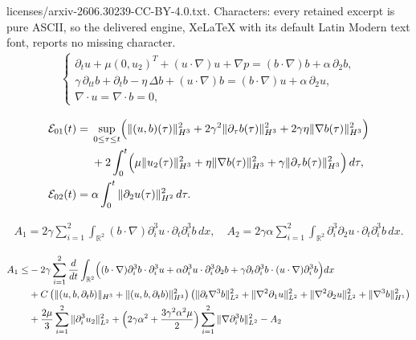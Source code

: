 \documentclass[10pt,a4paper]{amsart}
\begin{document}
licenses/arxiv-2606.30239-CC-BY-4.0.txt. Characters: every retained excerpt is pure ASCII, so the delivered engine, XeLaTeX with its default Latin Modern text font, reports no missing character.
\begin{align}\label{type-wave-1}
	\left \{
	\begin{array}{lll}
		\partial_t u + \mu(0,u_2)^T + (u\cdot\nabla)u + \nabla p
		= (b\cdot\nabla)b + \alpha\,\partial_2 b, \\[5pt]
		\gamma\,\partial_{tt}b + \partial_t b - \eta\,\Delta b + (u\cdot\nabla)b
		= (b\cdot\nabla)u + \alpha\,\partial_2 u, \\[5pt]
		\nabla\cdot u = \nabla\cdot b = 0,
	\end{array}
	\right.
\end{align}

\begin{align}
	\mathcal{E}_{01}(t)
	={}& \sup_{0\leq\tau\leq t}\Bigl(\|(u,b)(\tau)\|_{H^3}^2
	+ 2\gamma^2\|\partial_\tau b(\tau)\|_{H^3}^2
	+ 2\gamma\eta\|\nabla b(\tau)\|_{H^3}^2\Bigr)\nonumber\\
	&+ 2\int_{0}^t\Bigl(\mu\|u_2(\tau)\|_{H^3}^2
	+ \eta\|\nabla b(\tau)\|_{H^3}^2
	+ \gamma\|\partial_\tau b(\tau)\|_{H^3}^2\Bigr)\,d\tau,\label{E00}\\
	\mathcal{E}_{02}(t)
	={}& \alpha\int_{0}^t\|\partial_2 u(\tau)\|_{H^2}^2\,d\tau.\label{E01}
\end{align}

\begin{align}
	A_1 = 2\gamma\sum_{i=1}^2\int_{\mathbb{R}^2}
	(b\cdot\nabla)\partial_i^3 u\cdot\partial_t\partial_i^3 b\,dx,
	\quad
	A_{2} = 2\gamma\alpha\sum_{i=1}^2\int_{\mathbb{R}^2}
	\partial_i^3\partial_2 u\cdot\partial_t\partial_i^3 b\,dx.\label{def A12}
\end{align}

\begin{align}\label{AAA1}
		A_1 \leq&
		-2\gamma\sum_{i=1}^2\frac{d}{dt}\int_{\mathbb{R}^2}
		\Bigl((b\cdot\nabla)\partial_i^3 b\cdot\partial_i^3 u
		+\alpha\partial_i^3 u\cdot\partial_i^3\partial_2 b
		+\gamma\partial_t\partial_i^3 b\cdot (u\cdot\nabla)\partial_i^3 b\Bigr)dx
		\notag\\
        &+C\left(\|(u,b,\partial_tb)\|_{H^{3}}+\|(u,b,\partial_tb)\|_{H^{3}}^2\right)\left(\|\partial_t\nabla^3b\|_{L^2}^2
        +\|\nabla^2\partial_1u\|_{L^2}^2+\|\nabla^2\partial_2u\|_{L^2}^2+\|\nabla^3 b\|_{H^1}^2\right)\notag\\
		&+\frac{2\mu}{3}\sum_{i=1}^2\|\partial_i^3 u_2\|_{L^2}^2
		+\Bigl(2\gamma\alpha^2+\frac{3\gamma^2\alpha^2\mu}{2}\Bigr)
		\sum_{i=1}^2\|\nabla\partial_i^3 b\|_{L^2}^2 -A_2
	\end{align}
\end{document}
